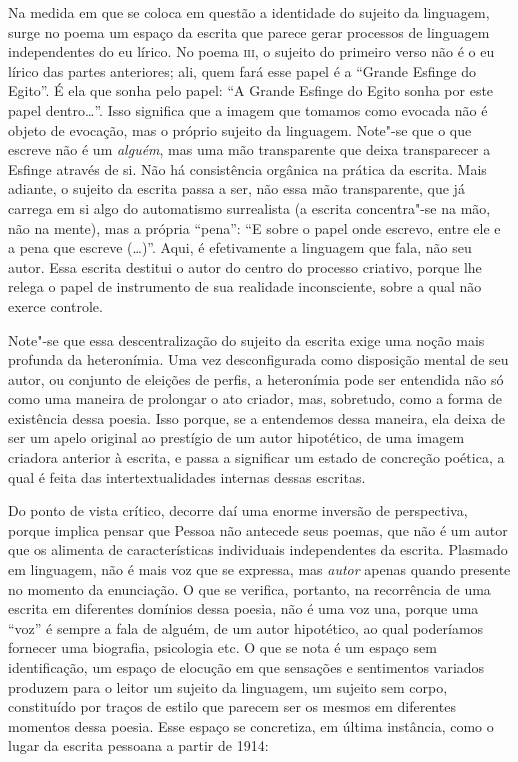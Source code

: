 Na medida em que se coloca em questão a identidade do sujeito da
linguagem, surge no poema um espaço da escrita que parece gerar
processos de linguagem independentes do eu lírico. No poema
\textsc{iii}, o sujeito do primeiro verso não é o eu lírico das partes
anteriores; ali, quem fará esse papel é a ``Grande Esfinge do Egito''. É
ela que sonha pelo papel: ``A Grande Esfinge do Egito sonha por este
papel dentro\ldots{}''. Isso significa que a imagem que tomamos como evocada
não é objeto de evocação, mas o próprio sujeito da linguagem. Note"-se
que o que escreve não é um \emph{alguém}, mas uma mão transparente que
deixa transparecer a Esfinge através de si. Não há consistência orgânica
na prática da escrita. Mais adiante, o sujeito da escrita passa a ser,
não essa mão transparente, que já carrega em si algo do automatismo
surrealista (a escrita concentra"-se na mão, não na mente), mas a própria
``pena'': ``E sobre o papel onde escrevo, entre ele e a pena que escreve
(\ldots{})''. Aqui, é efetivamente a linguagem que fala, não seu autor. Essa
escrita destitui o autor do centro do processo criativo, porque lhe
relega o papel de instrumento de sua realidade inconsciente, sobre a
qual não exerce controle.

Note"-se que essa descentralização do sujeito da escrita exige uma noção
mais profunda da heteronímia. Uma vez desconfigurada como disposição
mental de seu autor, ou conjunto de eleições de perfis, a heteronímia
pode ser entendida não só como uma maneira de prolongar o ato criador,
mas, sobretudo, como a forma de existência dessa poesia. Isso porque, se
a entendemos dessa maneira, ela deixa de ser um apelo original ao
prestígio de um autor hipotético, de uma imagem criadora anterior à
escrita, e passa a significar um estado de concreção poética, a qual é
feita das intertextualidades internas dessas escritas.

Do ponto de vista crítico, decorre daí uma enorme inversão de
perspectiva, porque implica pensar que Pessoa não antecede seus poemas,
que não é um autor que os alimenta de características individuais
independentes da escrita. Plasmado em linguagem, não é mais voz que se
expressa, mas \emph{autor} apenas quando presente no momento da
enunciação. O que se verifica, portanto, na recorrência de uma escrita
em diferentes domínios dessa poesia, não é uma voz una, porque uma
``voz'' é sempre a fala de alguém, de um autor hipotético, ao qual
poderíamos fornecer uma biografia, psicologia etc. O que se nota é um
espaço sem identificação, um espaço de elocução em que sensações e
sentimentos variados produzem para o leitor um sujeito da linguagem, um
sujeito sem corpo, constituído por traços de estilo que parecem ser os
mesmos em diferentes momentos dessa poesia. Esse espaço se concretiza,
em última instância, como o lugar da escrita pessoana a partir de 1914:

